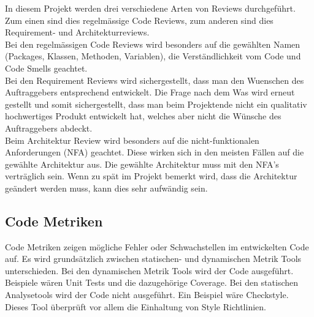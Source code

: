 \noindent In diesem Projekt werden drei verschiedene Arten von Reviews durchgeführt. Zum einen sind dies regelmässige Code Reviews, zum anderen sind dies Requirement- und Architekturreviews.\\

\noindent Bei den regelmässigen Code Reviews wird besonders auf die gewählten Namen (Packages, Klassen, Methoden, Variablen), die Verständlichkeit vom Code und Code Smells geachtet.\\

\noindent Bei den Requirement Reviews wird sichergestellt, dass man den Wuenschen des Auftraggebers entsprechend entwickelt. Die Frage nach dem \glqq Was\grqq{} wird erneut gestellt und somit sichergestellt, dass man beim Projektende nicht ein qualitativ hochwertiges Produkt entwickelt hat, welches aber nicht die Wünsche des Auftraggebers abdeckt.\\ 

\noindent Beim Architektur Review wird besonders auf die nicht-funktionalen Anforderungen (NFA) geachtet. Diese wirken sich in den meisten Fällen auf die gewählte Architektur aus. Die gewählte Architektur muss mit den NFA's verträglich sein. Wenn zu spät im Projekt bemerkt wird, dass die Architektur geändert werden muss, kann dies sehr aufwändig sein.
\subsection{Code Metriken}
Code Metriken zeigen mögliche Fehler oder Schwachstellen im entwickelten Code auf. Es wird grundsätzlich zwischen statischen- und dynamischen Metrik Tools unterschieden. Bei den dynamischen Metrik Tools wird der Code ausgeführt. Beispiele wären Unit Tests und die dazugehörige Coverage. Bei den statischen Analysetools wird der Code nicht ausgeführt. Ein Beispiel wäre Checkstyle. Dieses Tool überprüft vor allem die Einhaltung von Style Richtlinien.\\